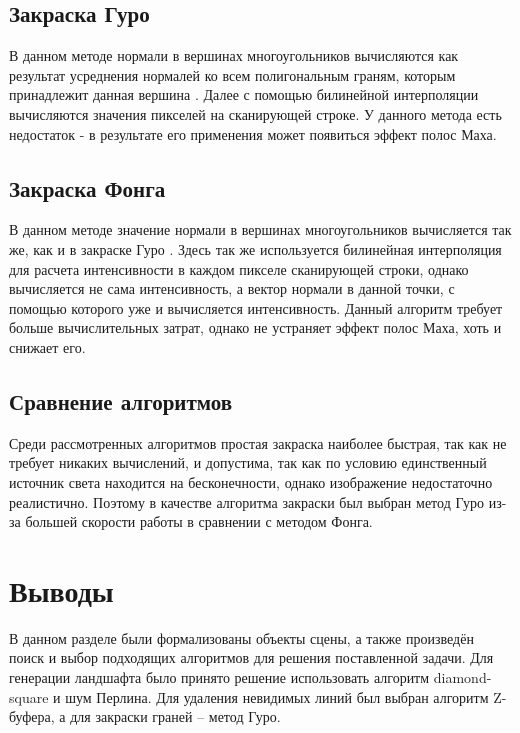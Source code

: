 \subsection{Закраска Гуро}

В данном методе нормали в вершинах многоугольников вычисляются как результат усреднения нормалей ко всем полигональным граням, которым принадлежит данная вершина \cite{algorithms}. Далее с помощью билинейной интерполяции вычисляются значения пикселей на сканирующей строке. У данного метода есть недостаток - в результате его применения может появиться эффект полос Маха.

\subsection{Закраска Фонга}

В данном методе значение нормали в вершинах многоугольников вычисляется так же, как и в закраске Гуро \cite{algorithms}. Здесь так же используется билинейная интерполяция для расчета интенсивности в каждом пикселе сканирующей строки, однако вычисляется не сама интенсивность, а вектор нормали в данной точки, с помощью которого уже и вычисляется интенсивность. Данный алгоритм требует больше вычислительных затрат, однако не устраняет эффект полос Маха, хоть и снижает его.

\subsection{Сравнение алгоритмов}

Среди рассмотренных алгоритмов простая закраска наиболее быстрая, так как не требует никаких вычислений, и допустима, так как по условию единственный источник света находится на бесконечности, однако изображение недостаточно реалистично. Поэтому в качестве алгоритма закраски был выбран метод Гуро из-за большей скорости работы в сравнении с методом Фонга.

\section{Выводы}

В данном разделе были формализованы объекты сцены, а также произведён поиск и выбор подходящих алгоритмов для решения поставленной задачи. Для генерации ландшафта было принято решение использовать алгоритм diamond-square и шум Перлина. Для удаления невидимых линий был выбран алгоритм Z-буфера, а для закраски граней -- метод Гуро.
